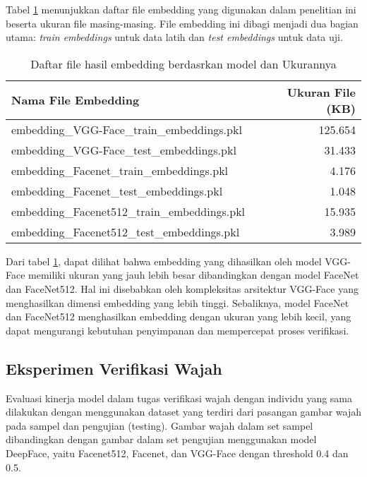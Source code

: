\documentclass[a4paper, 11pt]{article}
\begin{document}
Tabel \ref{tab:embedding_files} menunjukkan daftar file embedding yang digunakan dalam penelitian ini beserta ukuran file masing-masing. File embedding ini dibagi menjadi dua bagian utama: \textit{train embeddings} untuk data latih dan \textit{test embeddings} untuk data uji.

\begin{table}[h]
    \centering
    
    \begin{tabular}{|l|r|}
        \hline
        \textbf{Nama File Embedding} & \textbf{Ukuran File (KB)} \\
        \hline
        embedding\_VGG-Face\_train\_embeddings.pkl & 125.654 \\
        embedding\_VGG-Face\_test\_embeddings.pkl  & 31.433 \\
        embedding\_Facenet\_train\_embeddings.pkl  & 4.176 \\
        embedding\_Facenet\_test\_embeddings.pkl   & 1.048 \\
        embedding\_Facenet512\_train\_embeddings.pkl & 15.935 \\
        embedding\_Facenet512\_test\_embeddings.pkl  & 3.989 \\
        \hline
    \end{tabular}
    \caption{Daftar file hasil embedding berdasrkan model dan Ukurannya}
    \label{tab:embedding_files}
\end{table}

Dari tabel \ref{tab:embedding_files}, dapat dilihat bahwa embedding yang dihasilkan oleh model VGG-Face memiliki ukuran yang jauh lebih besar dibandingkan dengan model FaceNet dan FaceNet512. Hal ini disebabkan oleh kompleksitas arsitektur VGG-Face yang menghasilkan dimensi embedding yang lebih tinggi. Sebaliknya, model FaceNet dan FaceNet512 menghasilkan embedding dengan ukuran yang lebih kecil, yang dapat mengurangi kebutuhan penyimpanan dan mempercepat proses verifikasi.



\subsection{Eksperimen Verifikasi Wajah}
Evaluasi kinerja model dalam tugas verifikasi wajah dengan individu yang sama dilakukan dengan menggunakan dataset yang terdiri dari pasangan gambar wajah pada sampel dan pengujian (testing). Gambar wajah dalam set sampel dibandingkan dengan gambar dalam set pengujian menggunakan model DeepFace, yaitu Facenet512, Facenet, dan VGG-Face dengan threshold 0.4 dan 0.5.
\end{document}
